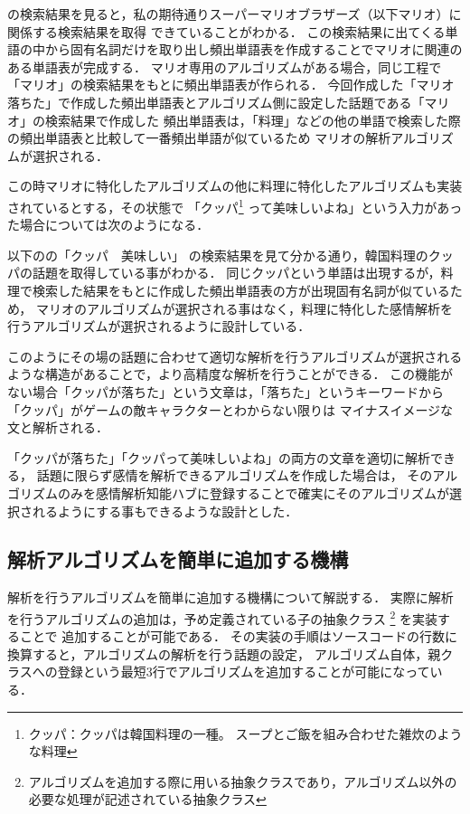 の検索結果を見ると，私の期待通りスーパーマリオブラザーズ（以下マリオ）に関係する検索結果を取得
できていることがわかる．
この検索結果に出てくる単語の中から固有名詞だけを取り出し頻出単語表を作成することでマリオに関連のある単語表が完成する．
マリオ専用のアルゴリズムがある場合，同じ工程で「マリオ」の検索結果をもとに頻出単語表が作られる．
今回作成した「マリオ　落ちた」で作成した頻出単語表とアルゴリズム側に設定した話題である「マリオ」の検索結果で作成した
頻出単語表は，「料理」などの他の単語で検索した際の頻出単語表と比較して一番頻出単語が似ているため
マリオの解析アルゴリズムが選択される．

この時マリオに特化したアルゴリズムの他に料理に特化したアルゴリズムも実装されているとする，その状態で
「クッパ\footnote{クッパ：クッパは韓国料理の一種。 スープとご飯を組み合わせた雑炊のような料理}
って美味しいよね」という入力があった場合については次のようになる．

以下のの「クッパ　美味しい」
の検索結果を見て分かる通り，韓国料理のクッパの話題を取得している事がわかる．
同じクッパという単語は出現するが，料理で検索した結果をもとに作成した頻出単語表の方が出現固有名詞が似ているため，
マリオのアルゴリズムが選択される事はなく，料理に特化した感情解析を行うアルゴリズムが選択されるように設計している．


このようにその場の話題に合わせて適切な解析を行うアルゴリズムが選択されるような構造があることで，より高精度な解析を行うことができる．
この機能がない場合「クッパが落ちた」という文章は，「落ちた」というキーワードから「クッパ」がゲームの敵キャラクターとわからない限りは
マイナスイメージな文と解析される．

「クッパが落ちた」「クッパって美味しいよね」の両方の文章を適切に解析できる，
話題に限らず感情を解析できるアルゴリズムを作成した場合は，
そのアルゴリズムのみを感情解析知能ハブに登録することで確実にそのアルゴリズムが選択されるようにする事もできるような設計とした．

\subsection{解析アルゴリズムを簡単に追加する機構}
解析を行うアルゴリズムを簡単に追加する機構について解説する．
実際に解析を行うアルゴリズムの追加は，予め定義されている子の抽象クラス
\footnote{アルゴリズムを追加する際に用いる抽象クラスであり，アルゴリズム以外の必要な処理が記述されている抽象クラス}
を実装することで
追加することが可能である．
その実装の手順はソースコードの行数に換算すると，アルゴリズムの解析を行う話題の設定，
アルゴリズム自体，親クラスへの登録という最短3行でアルゴリズムを追加することが可能になっている．

